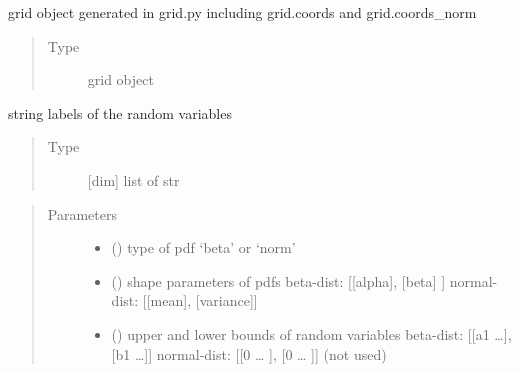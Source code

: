 \documentclass[letterpaper,10pt,english,openany,oneside]{sphinxmanual}
\begin{document}
\begin{fulllineitems}
\begin{fulllineitems}
\label{\detokenize{pygpc:pygpc.quad.Quad.grid}}
grid object generated in grid.py including grid.coords and grid.coords\_norm
\begin{quote}\begin{description}
\item[{Type}] \leavevmode
grid object

\end{description}\end{quote}

\end{fulllineitems}


\begin{fulllineitems}
\label{\detokenize{pygpc:pygpc.quad.Quad.random_vars}}
string labels of the random variables
\begin{quote}\begin{description}
\item[{Type}] \leavevmode
{[}dim{]} list of str

\end{description}\end{quote}

\end{fulllineitems}

\begin{quote}\begin{description}
\item[{Parameters}] \leavevmode\begin{itemize}
\item {} 
 (\sphinxstyleliteralemphasis{\sphinxupquote{{[}}}\sphinxstyleliteralemphasis{\sphinxupquote{{]} }}) \textendash{} type of pdf ‘beta’ or ‘norm’

\item {} 
 () \textendash{} shape parameters of pdfs
beta-dist:   {[}{[}alpha{]}, {[}beta{]}    {]}
normal-dist: {[}{[}mean{]},  {[}variance{]}{]}

\item {} 
 () \textendash{} upper and lower bounds of random variables
beta-dist:   {[}{[}a1 …{]}, {[}b1 …{]}{]}
normal-dist: {[}{[}0 … {]}, {[}0 … {]}{]} (not used)


\end{itemize}
\end{description}
\end{quote}
\end{fulllineitems}
\end{document}
